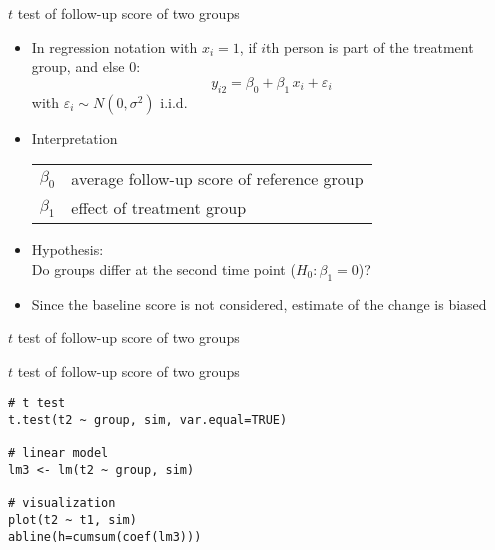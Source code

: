 \documentclass{beamer}
\begin{document}
\begin{frame}{$t$ test of follow-up score of two groups}
\begin{itemize}
  \item In regression notation with $x_i = 1$, if $i$th person is part of
    the treatment group, and else $0$:
    \[
      y_{i2} = \beta_0 + \beta_1 \, x_i + \varepsilon_i
    \]
    with $\varepsilon_i \sim N(0, \sigma^2)$ i.i.d.
  \item Interpretation
    \begin{center}
    \begin{tabular}{ll}
    $\beta_0$ & average follow-up score of reference group\\
    $\beta_1$ & effect of treatment group
    \end{tabular}
    \end{center}
  \item Hypothesis:\\
        Do groups differ at the second time point ($H_0\colon \beta_1 = 0$)?
  \item Since the baseline score is not considered, estimate of the change
    is biased
\end{itemize}
\end{frame}


\begin{frame}{$t$ test of follow-up score of two groups}
\begin{center}
\end{center}
\end{frame}

{

\begin{frame}[fragile]{$t$ test of follow-up score of two groups}
\begin{lstlisting}
# t test
t.test(t2 ~ group, sim, var.equal=TRUE)

# linear model
lm3 <- lm(t2 ~ group, sim)

# visualization
plot(t2 ~ t1, sim)
abline(h=cumsum(coef(lm3)))
\end{lstlisting}
\end{frame}

}
\end{document}
